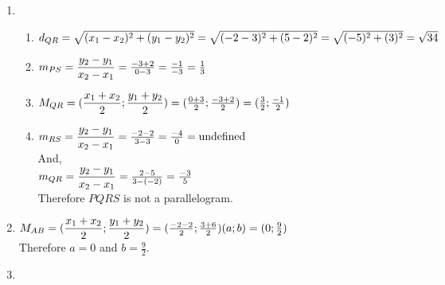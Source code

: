 \begin{eocsolutions}{}
{\begin{enumerate}[itemsep=5pt, label=\textbf{\arabic*}. ]
Solve for $x$: \\
  $\frac{1}{2} = \frac{-2+x}{2} \\ 
  1 = -2+x\\ 
  x = 3 \\ $
Solve for $y$: \\
  $1 = \frac{-1+y}{2} \\ 
  2 = -1+y \\ 
  y = 3 \\ $
Therefore $H(3;3)$ \\
\item  %
\begin{enumerate}[itemsep=5pt, label=\textbf{(\alph*)} ] 
\item
$d_{QR} = \sqrt{(x_1-x_2)^2+(y_1-y_2)^2}\\
    = \sqrt{(-2-3)^2+(5-2)^2}\\
    = \sqrt{(-5)^2+(3)^2}\\
    = \sqrt{34}$
\item
$m_{PS} = \dfrac{y_2-y_1}{x_2-x_1}\\
    = \frac{-3+2}{0-3}\\
    = \frac{-1}{-3}\\
    = \frac{1}{3}$
\item
$M_{QR} = (\dfrac{x_1+x_2}{2};\dfrac{y_1+y_2}{2})\\[4pt]
    = (\frac{0+3}{2};\frac{-3+2}{2})\\
    = (\frac{3}{2};\frac{-1}{2})$
\item
$m_{RS} = \dfrac{y_2-y_1}{x_2-x_1}\\
    = \frac{-2-2}{3-3}\\
    = \frac{-4}{0}\\
    = \mbox{undefined}$\\
And, \\
$m_{QR} = \dfrac{y_2-y_1}{x_2-x_1}\\
    = \frac{2-5}{3-(-2)}\\
    = \frac{-3}{5}$\\
Therefore $PQRS$ is not a parallelogram.
\end{enumerate}
\item  %
$M_{AB} = (\dfrac{x_1+x_2}{2};\dfrac{y_1+y_2}{2})\\[4pt]
	= (\frac{-2-2}{2};\frac{3+6}{2})\\
 (a;b) = (0;\frac{9}{2})$\\
Therefore $a=0$ and $b=\frac{9}{2}$.
\item  %
\begin{enumerate}[itemsep=5pt, label=\textbf{(\alph*)} ] 

\end{enumerate}
\end{enumerate}}
\end{eocsolutions}
